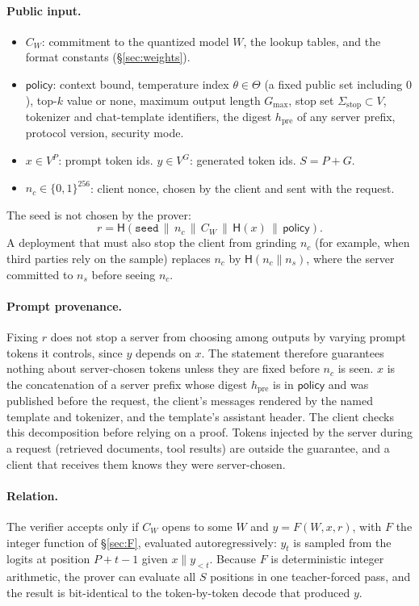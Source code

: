 \documentclass[11pt]{article}
\begin{document}
\paragraph{Public input.}
\begin{itemize}
\item \(C_W\): commitment to the quantized model \(W\), the lookup tables, and the format constants (\S\ref{sec:weights}).
\item \(\mathsf{policy}\): context bound, temperature index \(\theta \in \Theta\) (a fixed public set including \(0\)), top-\(k\) value or none, maximum output length \(G_{\max}\), stop set \(\Sigma_{\mathrm{stop}} \subset V\), tokenizer and chat-template identifiers, the digest \(h_{\mathrm{pre}}\) of any server prefix, protocol version, security mode.
\item \(x \in V^{P}\): prompt token ids. \(y \in V^{G}\): generated token ids. \(S = P + G\).
\item \(n_c \in \{0,1\}^{256}\): client nonce, chosen by the client and sent with the request.
\end{itemize}
The seed is not chosen by the prover:
\[
r = \mathsf{H}(\texttt{seed} \,\|\, n_c \,\|\, C_W \,\|\, \mathsf{H}(x) \,\|\, \mathsf{policy}).
\]
A deployment that must also stop the client from grinding \(n_c\) (for example, when third parties rely on the sample) replaces \(n_c\) by \(\mathsf{H}(n_c \| n_s)\), where the server committed to \(n_s\) before seeing \(n_c\).

\paragraph{Prompt provenance.}
Fixing \(r\) does not stop a server from choosing among outputs by varying prompt tokens it controls, since \(y\) depends on \(x\).
The statement therefore guarantees nothing about server-chosen tokens unless they are fixed before \(n_c\) is seen.
\(x\) is the concatenation of a server prefix whose digest \(h_{\mathrm{pre}}\) is in \(\mathsf{policy}\) and was published before the request, the client's messages rendered by the named template and tokenizer, and the template's assistant header.
The client checks this decomposition before relying on a proof.
Tokens injected by the server during a request (retrieved documents, tool results) are outside the guarantee, and a client that receives them knows they were server-chosen.

\paragraph{Relation.}
The verifier accepts only if \(C_W\) opens to some \(W\) and \(y = F(W, x, r)\), with \(F\) the integer function of \S\ref{sec:F}, evaluated autoregressively: \(y_t\) is sampled from the logits at position \(P + t - 1\) given \(x \| y_{<t}\).
Because \(F\) is deterministic integer arithmetic, the prover can evaluate all \(S\) positions in one teacher-forced pass, and the result is bit-identical to the token-by-token decode that produced \(y\).
\end{document}

